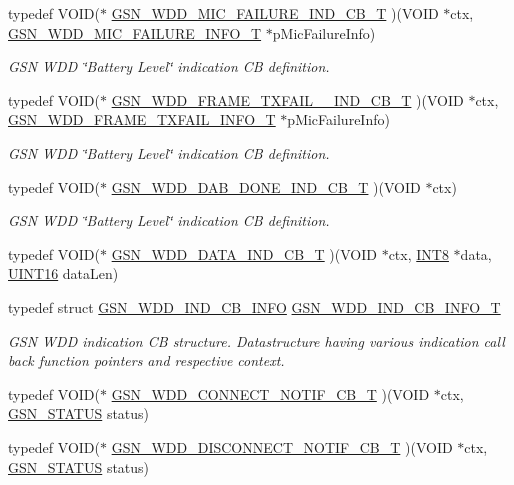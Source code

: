 \begin{DoxyCompactItemize}
typedef VOID($\ast$ \hyperlink{a00677_ga7ccb461a81661940f165a9e3d1812421}{GSN\_\-WDD\_\-MIC\_\-FAILURE\_\-IND\_\-CB\_\-T} )(VOID $\ast$ctx, \hyperlink{a00391}{GSN\_\-WDD\_\-MIC\_\-FAILURE\_\-INFO\_\-T} $\ast$pMicFailureInfo)
\begin{DoxyCompactList}\small\item\em GSN WDD \char`\"{}Battery Level\char`\"{} indication CB definition. \end{DoxyCompactList}\item 
typedef VOID($\ast$ \hyperlink{a00677_ga7e71a759def3d63d0aff2122a2b21bef}{GSN\_\-WDD\_\-FRAME\_\-TXFAIL\_\-\_\-IND\_\-CB\_\-T} )(VOID $\ast$ctx, \hyperlink{a00382}{GSN\_\-WDD\_\-FRAME\_\-TXFAIL\_\-INFO\_\-T} $\ast$pMicFailureInfo)
\begin{DoxyCompactList}\small\item\em GSN WDD \char`\"{}Battery Level\char`\"{} indication CB definition. \end{DoxyCompactList}\item 
typedef VOID($\ast$ \hyperlink{a00677_ga609ae39dc432b9821b764bea4957369a}{GSN\_\-WDD\_\-DAB\_\-DONE\_\-IND\_\-CB\_\-T} )(VOID $\ast$ctx)
\begin{DoxyCompactList}\small\item\em GSN WDD \char`\"{}Battery Level\char`\"{} indication CB definition. \end{DoxyCompactList}\item 
typedef VOID($\ast$ \hyperlink{a00603_a6ba5be1c4251a77b2a642319af4b696b}{GSN\_\-WDD\_\-DATA\_\-IND\_\-CB\_\-T} )(VOID $\ast$ctx, \hyperlink{a00660_ga307b8734c020247f6bac4fcde0dcfbb9}{INT8} $\ast$data, \hyperlink{a00660_ga09f1a1fb2293e33483cc8d44aefb1eb1}{UINT16} dataLen)
\item 
typedef struct \hyperlink{a00275}{GSN\_\-WDD\_\-IND\_\-CB\_\-INFO} \hyperlink{a00677_gaeb9f80300f95181d19a845e3f786daae}{GSN\_\-WDD\_\-IND\_\-CB\_\-INFO\_\-T}
\begin{DoxyCompactList}\small\item\em GSN WDD indication CB structure. Datastructure having various indication call back function pointers and respective context. \end{DoxyCompactList}\item 
typedef VOID($\ast$ \hyperlink{a00603_afa291ab10917d97cae6b9207522e623b}{GSN\_\-WDD\_\-CONNECT\_\-NOTIF\_\-CB\_\-T} )(VOID $\ast$ctx, \hyperlink{a00660_gada5951904ac6110b1fa95e51a9ddc217}{GSN\_\-STATUS} status)
\item 
typedef VOID($\ast$ \hyperlink{a00603_ac5fbb773daa449d33e065683260e253d}{GSN\_\-WDD\_\-DISCONNECT\_\-NOTIF\_\-CB\_\-T} )(VOID $\ast$ctx, \hyperlink{a00660_gada5951904ac6110b1fa95e51a9ddc217}{GSN\_\-STATUS} status)

\end{DoxyCompactItemize}

